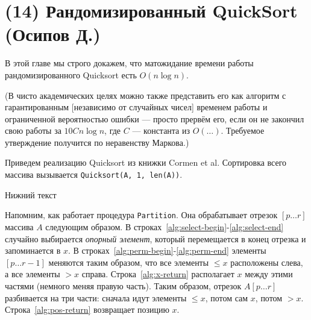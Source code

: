 \section{(14) Рандомизированный QuickSort (Осипов Д.)}

В этой главе мы строго докажем, что матожидание времени работы рандомизированного Quicksort есть $O(n\log n)$.

(В чисто академических целях можно также представить его как алгоритм с гарантированным [независимо от случайных чисел] временем работы и ограниченной вероятностью ошибки --- просто прервём его, если он не закончил свою работы за $10Cn\log n$, где $C$ --- константа из $O(\ldots)$. Требуемое утверждение получится по неравенству Маркова.)

Приведем реализацию Quicksort из книжки Cormen et al. Сортировка всего массива вызывается \texttt{Quicksort(A, 1, len(A))}.

\begin{algorithm}[H]
	\caption{Нижний текст}
	\DontPrintSemicolon
	\;
\end{algorithm}

Напомним, как работает процедура \texttt{Partition}. Она обрабатывает отрезок $[p\ldots r]$ массива $A$ следующим образом.  В строках~\ref{alg:select-begin}-\ref{alg:select-end} случайно выбирается \textit{опорный элемент}, который перемещается в конец отрезка и запоминается в $x$. В строках~\ref{alg:perm-begin}-\ref{alg:perm-end} элементы $[p\ldots r-1]$ меняются таким образом, что все элементы $\leq x$ расположены слева, а все элементы $> x$ справа. Строка~\ref{alg:x-return} располагает $x$ между этими частями (немного меняя правую часть). Таким образом, отрезок $A[p\ldots r]$ разбивается на три части: сначала идут элементы $\leq x$, потом сам $x$, потом $>x$. Строка~\ref{alg:pos-return} возвращает позицию $x$.

